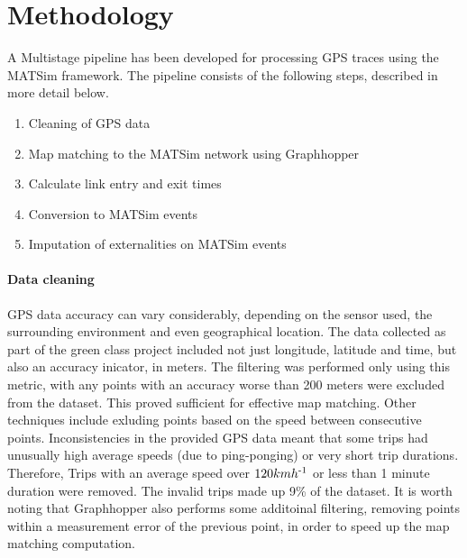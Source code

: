 \section{Methodology}



 A Multistage pipeline has been developed for processing GPS traces using the MATSim framework. The pipeline consists of the following steps, described in more detail below.

\begin{enumerate}
 	\item Cleaning of GPS data
 	\item Map matching to the MATSim network using Graphhopper
 	\item Calculate link entry and exit times
 	\item Conversion to MATSim events
	\item Imputation of externalities on MATSim events
\end{enumerate}


\paragraph{Data cleaning}
GPS data accuracy can vary considerably, depending on the sensor used, the surrounding environment and even geographical location. 
The data collected as part of the green class project included not just longitude, latitude and time, but also an accuracy inicator, in meters. 
The filtering was performed only using this metric, with any points with an accuracy worse than 200 meters were excluded from the dataset. 
This proved sufficient for effective map matching. Other techniques include exluding points based on the speed between consecutive points. 
Inconsistencies in the provided GPS data meant that some trips had unusually high average speeds (due to ping-ponging) or very short trip durations. Therefore, Trips with an average speed over $120 kmh\textsuperscript{-1}$ or less than 1 minute duration were removed. The invalid trips made up 9\% of the dataset.
It is worth noting that Graphhopper also performs some additoinal filtering, removing points within a measurement error of the previous point, in order to speed up the map matching computation. 

